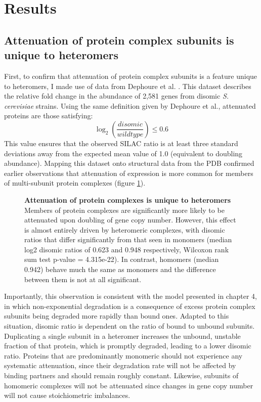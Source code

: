 \documentclass[a4paper,11pt,twoside,openright]{scrbook}
\begin{document}
\clearpage

\section{Results}

\subsection{Attenuation of protein complex subunits is unique to heteromers}
First, to confirm that attenuation of protein complex subunits is a feature unique to heteromers, I made use of data from Dephoure et al. \cite{Dephoure2014}. This dataset describes the relative fold change in the abundance of 2,581 genes from disomic \textit{S. cerevisiae} strains. Using the same definition given by Dephoure et al., attenuated proteins are those satisfying:
\begin{displaymath}
    \log_{2} \left( \frac{disomic}{wildtype} \right) \leq 0.6
\end{displaymath}
This value ensures that the observed SILAC ratio is at least three standard deviations away from the expected mean value of 1.0 (equivalent to doubling abundance). Mapping this dataset onto structural data from the PDB confirmed earlier observations that attenuation of expression is more common for members of multi-subunit protein complexes (figure \ref{figure:aneuploidy_qstype}).

\begin{figure}[h]
    \caption[Attenuation of protein complexes is unique to heteromers]{\sffamily \textbf{Attenuation of protein complexes is unique to heteromers} \\ \small Members of protein complexes are significantly more likely to be attenuated upon doubling of gene copy number. However, this effect is almost entirely driven by heteromeric complexes, with disomic ratios that differ significantly from that seen in monomers (median log2 disomic ratios of 0.623 and 0.948 respectively, Wilcoxon rank sum test p-value = 4.315e-22). In contrast, homomers (median 0.942) behave much the same as monomers and the difference between them is not at all significant.}
    \label{figure:aneuploidy_qstype}
\end{figure}

Importantly, this observation is consistent with the model presented in chapter 4, in which non-exponential degradation is a consequence of excess protein complex subunits being degraded more rapidly than bound ones. Adapted to this situation, disomic ratio is dependent on the ratio of bound to unbound subunits. Duplicating a single subunit in a heteromer increases the unbound, unstable fraction of that protein, which is promptly degraded, leading to a lower disomic ratio. Proteins that are predominantly monomeric should not experience any systematic attenuation, since their degradation rate will not be affected by binding partners and should remain roughly constant. Likewise, subunits of homomeric complexes will not be attenuated since changes in gene copy number will not cause stoichiometric imbalances.
\end{document}
